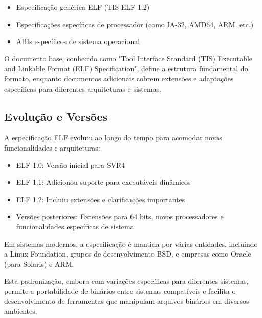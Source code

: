 \begin{itemize}
    \item Especificação genérica ELF (TIS ELF 1.2)
    \item Especificações específicas de processador (como IA-32, AMD64, ARM, etc.)
    \item ABIs específicos de sistema operacional
\end{itemize}

O documento base, conhecido como "Tool Interface Standard (TIS) Executable and Linkable Format (ELF) Specification", define a estrutura fundamental do formato, enquanto documentos adicionais cobrem extensões e adaptações específicas para diferentes arquiteturas e sistemas.

\subsection{Evolução e Versões}

A especificação ELF evoluiu ao longo do tempo para acomodar novas funcionalidades e arquiteturas:

\begin{itemize}
    \item ELF 1.0: Versão inicial para SVR4
    \item ELF 1.1: Adicionou suporte para executáveis dinâmicos
    \item ELF 1.2: Incluiu extensões e clarificações importantes
    \item Versões posteriores: Extensões para 64 bits, novos processadores e funcionalidades específicas de sistema
\end{itemize}

Em sistemas modernos, a especificação é mantida por várias entidades, incluindo a Linux Foundation, grupos de desenvolvimento BSD, e empresas como Oracle (para Solaris) e ARM.

Esta padronização, embora com variações específicas para diferentes sistemas, permite a portabilidade de binários entre sistemas compatíveis e facilita o desenvolvimento de ferramentas que manipulam arquivos binários em diversos ambientes.